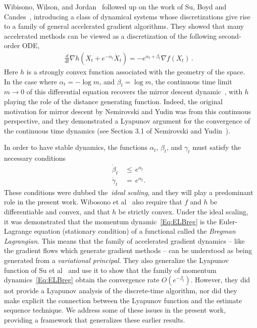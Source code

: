 \documentclass[11pt]{article}
\theoremstyle{plain}
\begin{document}
 Wibisono, Wilson, and Jordan~\cite{Acceleration} followed up on the work of Su, Boyd and Candes~\cite{SuBoydCandes14}, introducing a class of dynamical systems whose discretizations give rise to a family of general accelerated gradient algorithms. They showed that many accelerated methods can be viewed as a discretization of the following second-order ODE,
 \begin{align} \label{Eq:ELBreg} 
\frac{d}{dt} \nabla h(X_t + e^{-\alpha_t} \dot X_t) = -e^{\alpha_t+\beta_t} \nabla f(X_t)\,.
\end{align}
Here $h$ is a strongly convex function associated with the geometry of the space.  In the case where $\alpha_t=-\log m$, and $\beta_t = \log m$,  the continuous time limit $m \rightarrow 0$ of this differential equation recovers the mirror descent dynamic~\cite[(78)]{Acceleration}, with $h$ playing the role of the distance generating function.  Indeed, the original motivation for mirror descent by Nemirovski and Yudin was from this continuous perspective, and they demonstrated a Lyapunov argument for the convergence of the continuous time dynamics (see Section 3.1 of Nemirovski and Yudin~\cite{NemirovskiiYudin}).

In order to have stable dynamics, the functions $\alpha_t$, $\beta_t$, and $\gamma_t$ must satisfy the necessary conditions
\begin{subequations}\label{Eq:IdeSca}
\begin{align}
\dot \beta_t \,&\leq\, e^{\alpha_t}   \label{Eq:IdeScaBet} \\
\dot \gamma_t \,&=\, e^{\alpha_t}  \label{Eq:IdeScaGam}.
\end{align}
\end{subequations}
These conditions were dubbed the~\emph{ideal scaling}, and they will play a predominant role in the present work.  Wibosono et al~\cite{Acceleration} also require that  $f$ and $h$ be differentiable and convex, and that $h$ be strictly convex. Under the ideal scaling, it was demonstrated that the momentum dynamic~\eqref{Eq:ELBreg} is the Euler-Lagrange equation (stationary condition) of a functional called the {\em Bregman Lagrangian}. This means that the family of accelerated gradient dynamics -- like the gradient flows which generate gradient methods -- can be understood as being generated from a {\em variational principal}. They also generalize the Lyapunov function of Su et al~\cite{SuBoydCandes14} and use it to show that the family of momentum dynamics~\eqref{Eq:ELBreg} obtain the convergence rate $O(e^{-\beta_t})$. However, they did not provide a Lyapunov analysis of the discrete-time algorithm, nor did they make explicit the connection between the Lyapunov function and the estimate sequence technique. We address some of these issues in the present work, providing a framework that generalizes these earlier results.
\end{document}

